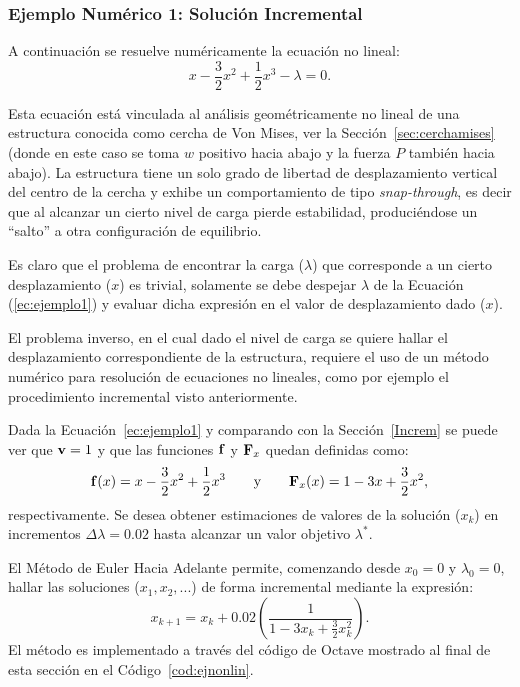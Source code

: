 \subsubsection{Ejemplo Numérico 1: Solución Incremental}\label{ej1}

A continuación se resuelve numéricamente la ecuación no lineal:
%
\begin{equation}\label{ec:ejemplo1}
x-\frac{3}{2}x^2+\frac{1}{2}x^3-\lambda=0.
\end{equation}

Esta ecuación está vinculada al análisis geométricamente no lineal de una estructura conocida como cercha de Von Mises, ver la Sección~\ref{sec:cerchamises} (donde en este caso se toma $w$ positivo hacia abajo y la fuerza $P$ también hacia abajo). La estructura tiene un solo grado de libertad de desplazamiento vertical del centro de la cercha y exhibe un comportamiento de tipo \textit{snap-through}, es decir que al alcanzar un cierto nivel de carga pierde estabilidad, produciéndose un ``salto'' a otra configuración de equilibrio.


Es claro que el problema de encontrar la carga ($\lambda$) que corresponde a un cierto desplazamiento ($x$) es trivial, solamente se debe despejar $\lambda$ de la Ecuación (\ref{ec:ejemplo1}) y evaluar dicha expresión en el valor de desplazamiento dado ($x$).

El problema inverso, en el cual dado el nivel de carga se quiere hallar el desplazamiento correspondiente de la estructura, requiere el uso de un método numérico para resolución de ecuaciones no lineales, como por ejemplo el procedimiento incremental visto anteriormente.

Dada la Ecuación~\eqref{ec:ejemplo1} y comparando con la Sección~\ref{Increm} se puede ver que ${\bf v} = 1$ y que las funciones ${\bf f}$ y ${\bf F}_x$ quedan definidas como: 
%
\begin{equation}
	{\bf f}(x)=x-\frac{3}{2}x^2+\frac{1}{2}x^3 \qquad \text{y} \qquad  {\bf F}_x(x)=1-3x+\frac{3}{2}x^2,
\end{equation}
respectivamente. %
%
Se desea obtener estimaciones de valores de la solución ($x_k$) en incrementos $\Delta \lambda=0.02$ hasta alcanzar un valor objetivo $\lambda^*$. %

El Método de Euler Hacia Adelante permite, comenzando desde $x_0=0$ y $\lambda_0=0$, hallar las soluciones ($x_1, x_2, ...$) de forma incremental mediante la expresión:
%
\begin{equation}
	x_{k+1} = x_k + 0.02 \left(\frac{1}{1-3x_k+\frac{3}{2}x_k^2}\right).
\end{equation}
%
El método es implementado a través del código de Octave mostrado al final de esta sección en el Código~\ref{cod:ejnonlin}.

